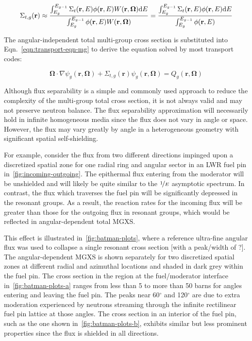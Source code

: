 \begin{dmath}
\label{eqn:sigt-mg-scalar}
\Sigma_{t,g}(\mathbf{r}) \approx \frac{\int\displaylimits_{E_{g}}^{E_{g-1}} \Sigma_{t}(\mathbf{r},E)\phi(\mathbf{r},E)W(\mathbf{r},\mathbf{\Omega})\mathrm{d}E}{\int\displaylimits_{E_{g}}^{E_{g-1}} \phi(\mathbf{r},E)W(\mathbf{r},\mathbf{\Omega})} = \frac{\int\displaylimits_{E_{g}}^{E_{g-1}} \Sigma_{t}(\mathbf{r},E)\phi(\mathbf{r},E)\mathrm{d}E}{\int\displaylimits_{E_{g}}^{E_{g-1}} \phi(\mathbf{r},E)}
\end{dmath}

\noindent The angular-independent total multi-group cross section is substituted into Eqn.~\ref{eqn:transport-eqn-mg} to derive the equation solved by most transport codes:

\begin{dmath}
\label{eqn:transport-eqn-mg-separate}
\mathbf{\Omega} \cdot \nabla \psi_{g}(\mathbf{r},\mathbf{\Omega}) + \Sigma_{t,g}(\mathbf{r})\psi_{g}(\mathbf{r},\mathbf{\Omega}) = Q_{g}(\mathbf{r},\mathbf{\Omega})
\end{dmath}

Although flux separability is a simple and commonly used approach to reduce the complexity of the multi-group total cross section, it is not always valid and may not preserve neutron balance. The flux separability approximation will necessarily hold in infinite homogeneous media since the flux does not vary in angle or space. However, the flux may vary greatly by angle in a heterogeneous geometry with significant spatial self-shielding.

For example, consider the flux from two different directions impinged upon a discretized spatial zone for one radial ring and angular sector in an LWR fuel pin in~\autoref{fig:incoming-outgoing}. The epithermal flux entering from the moderator will be unshielded and will likely be quite similar to the $\nicefrac{1}{E}$ asymptotic spectrum. In contrast, the flux which traverses the fuel pin will be significantly depressed in the resonant groups. As a result, the reaction rates for the incoming flux will be greater than those for the outgoing flux in resonant groups, which would be reflected in angular-dependent total MGXS.

This effect is illustrated in~\autoref{fig:batman-plots}, where a reference ultra-fine angular flux was used to collapse a single resonant cross section {\color{red}[with a peak/width of ?]}. The angular-dependent MGXS is shown separately for two discretized spatial zones at different radial and azimuthal locations and shaded in dark grey within the fuel pin. The cross section in the region at the fuel/moderator interface in~\autoref{fig:batman-plots-a} ranges from less than 5 to more than 50 barns for angles entering and leaving the fuel pin. The peaks near 60$^{\circ}$ and 120$^{\circ}$ are due to extra moderation experienced by neutrons streaming through the infinite rectilinear fuel pin lattice at those angles. The cross section in an interior of the fuel pin, such as the one shown in~\autoref{fig:batman-plots-b}, exhibits similar but less prominent properties since the flux is shielded in all directions.

